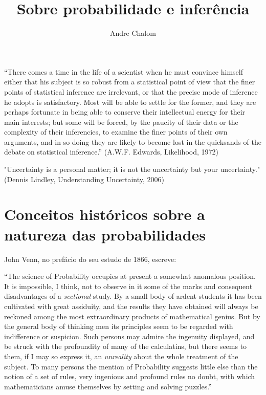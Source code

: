 \documentclass[12pt,a4paper]{article}
\begin{document}
\title{Sobre probabilidade e inferência}
\author{Andre Chalom}
\maketitle
\tableofcontents
\cleardoublepage

\null
\vfill
``There comes a time in the life of a scientist when he must convince himself
either that his subject is so robust from a statistical point of view that
the finer points of statistical inference are irrelevant, or that the precise
mode of inference he adopts is satisfactory. Most will be able to settle for
the former, and they are perhaps fortunate in being able to conserve their
intellectual energy for their main interests; but some will be forced, by the
paucity of their data or the complexity of their inferencies, to examine
the finer points of their own arguments, and in so doing they are likely
to become lost in the quicksands of the debate on statistical inference.''
(A.W.F. Edwards, Likelihood, 1972)
\vfill

"Uncertainty is a personal matter; it is not the uncertainty but your uncertainty."
(Dennis Lindley, Understanding Uncertainty, 2006)
\vfill

\cleardoublepage

\section{Conceitos históricos sobre a natureza das probabilidades}

John Venn, no prefácio do seu estudo de 1866, escreve:

``The science of Probability occupies at present a somewhat anomalous position. It is impossible, I think, not to observe
in it some of the marks and consequent disadvantages of a {\em sectional} study. By a small body of ardent students it
has been cultivated with great assiduity, and the results they have obtained will always be reckoned among the most 
extraordinary products of mathematical genius. But by the general body of thinking men its principles seem to be regarded
with indifference or suspicion. Such persons may admire the ingenuity displayed, and be struck with the profoundity
of many of the calculatins, but there seems to them, if I may so express it, an {\em unreality} about the whole treatment
of the subject. To many persons the mention of Probability suggests little else than the notion of a set of rules, very
ingenious and profound rules no doubt, with which mathematicians amuse themselves by setting and solving puzzles.''
\cite{Venn1866}
\end{document}
